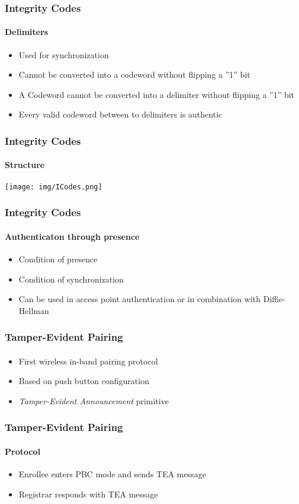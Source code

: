 \documentclass{beamer}
\begin{document}
\begin{frame}
	\frametitle{Integrity Codes}
	\framesubtitle{Delimiters}
	\begin{itemize}
		\item Used for synchronization
		\item Cannot be converted into a codeword without flipping a ''1'' bit
		\item A Codeword cannot be converted into a delimiter without flipping a ''1'' bit 
		\item Every valid codeword between to delimiters is authentic  
	\end{itemize}
\end{frame}
  
\begin{frame}
	\frametitle{Integrity Codes}
	\framesubtitle{Structure}
	\texttt{[image: img/ICodes.png]}
\end{frame}

\begin{frame}
	\frametitle{Integrity Codes}
	\framesubtitle{Authenticaton through presence}
	\begin{itemize}
		\item Condition of presence
		\item Condition of synchronization
		\item Can be used in access point authentication or in combination with Diffie-Hellman 
	\end{itemize}
\end{frame}

\begin{frame}
	\frametitle{Tamper-Evident Pairing}
	\framesubtitle{}
	\begin{itemize}
		\item First wireless in-band pairing protocol
		\item Based on push button configuration
		\item \textit{Tamper-Evident Announcement} primitive
	\end{itemize}
\end{frame}

\begin{frame}
	\frametitle{Tamper-Evident Pairing}
	\framesubtitle{Protocol}
	\begin{itemize}
		\item Enrollee enters PBC mode and sends TEA message
		\item Registrar responds with TEA message 
	\end{itemize}
\end{frame}
\end{document}
